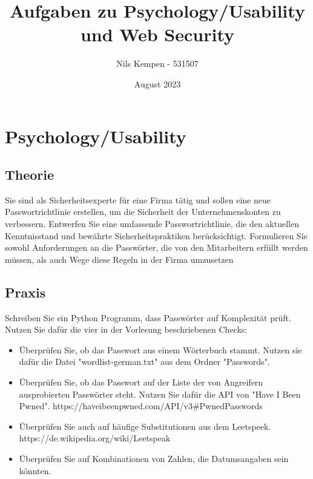 \documentclass{article}
\title{Aufgaben zu Psychology/Usability und Web Security}
\author{Nils Kempen - 531507}
\date{August 2023}
\begin{document}
\maketitle


\section{Psychology/Usability}

\subsection{Theorie}
Sie sind als Sicherheitsexperte für eine Firma tätig und sollen eine neue Passwortrichtlinie erstellen, um die Sicherheit der Unternehmenskonten zu verbessern. Entwerfen Sie eine umfassende Passwortrichtlinie, die den aktuellen Kenntnisstand und bewährte Sicherheitspraktiken berücksichtigt.
Formulieren Sie sowohl Anforderungen an die Passwörter, die von den Mitarbeitern erfüllt werden müssen, als auch Wege diese Regeln in der Firma umzusetzen

\subsection{Praxis}
Schreiben Sie ein Python Programm, dass Passwörter auf Komplexität prüft. Nutzen Sie dafür die vier in der Vorlesung beschriebenen Checks: 

\begin{itemize}
    \item Überprüfen Sie, ob das Passwort aus einem Wörterbuch stammt. Nutzen sie dafür die Datei "wordlist-german.txt" aus dem Ordner "Passwords".
    \item Überprüfen Sie, ob das Passwort auf der Liste der von Angreifern ausprobierten Passwörter steht. Nutzen Sie dafür die API von "Have I Been Pwned". https://haveibeenpwned.com/API/v3\#PwnedPasswords
    \item Überprüfen Sie auch auf häufige Substitutionen aus dem Leetspeek. https://de.wikipedia.org/wiki/Leetspeak
    \item Überprüfen Sie auf Kombinationen von Zahlen, die Datumsangaben sein könnten.
\end{itemize}
\end{document}
